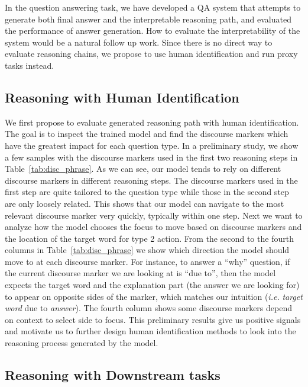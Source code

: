 In the question answering task, we have developed a QA system that attempts to generate both final answer and the interpretable reasoning path, and evaluated the performance of answer generation. How to evaluate the interpretability of the system would be a natural follow up work. Since there is no direct way to evaluate reasoning chains, we propose to use human identification and run proxy tasks instead. 


\subsection{Reasoning with Human Identification} \label{future_reason}


We first propose to evaluate generated reasoning path with human identification. The goal is to inspect the trained model and find the discourse markers which have the greatest impact for each question type. In a preliminary study, we show a few samples with the discourse markers used in the first two reasoning steps in Table~\ref{tab:disc_phrase}. As we can see, our model tends to rely on different discourse markers in different reasoning steps. The discourse markers used in the first step are quite tailored to the question type while those in the second step are only loosely related. This shows that our model can navigate to the most relevant discourse marker very quickly, typically within one step. Next we want to analyze how the model chooses the focus to move based on discourse markers and the location of the target word for type 2 action. From the second to the fourth columns in Table~\ref{tab:disc_phrase} we show which direction the model should move to at each discourse marker. For instance, to answer a ``why'' question, if the current discourse marker we are looking at is ``due to'', then the model expects the target word and the explanation part (the answer we are looking for) to appear on opposite sides of the marker, which matches our intuition (\textit{i.e.} \textit{target word} due to \textit{answer}). The fourth column shows some discourse markers depend on context to select side to focus. This preliminary results give us positive signals and motivate us to further design human identification methods to look into the reasoning process generated by the model.

\subsection{Reasoning with Downstream tasks}

